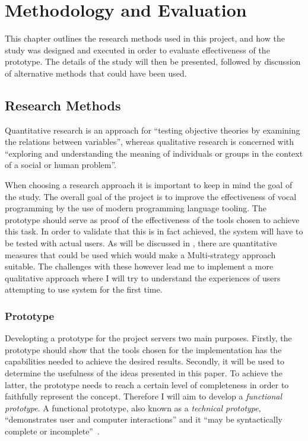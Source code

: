\documentclass[../thesis.tex]{subfiles}
\begin{document}
\chapter{Methodology and Evaluation}\label{methodology_and_evaluation}
This chapter outlines the research methods used in this project,
and how the study was designed and executed in order to evaluate effectiveness of the prototype.
The details of the study will then be presented, followed by
discussion of alternative methods that could have been used.


\section{Research Methods}
Quantitative research is an approach for ``testing objective theories by examining the relations between variables'', whereas qualitative research is concerned with ``exploring and understanding the meaning of individuals or groups in the context of a social or human problem''. \parencite{creswell2018}

When choosing a research approach it is important to keep in mind the goal of the study.
The overall goal of the project is to improve the effectiveness of vocal programming by the use of modern programming language tooling.
The prototype should serve as proof of the effectiveness of the tools chosen to achieve this task.
In order to validate that this is in fact achieved, the system will have to be tested with actual users.
As will be discussed in , there are quantitative measures that could be used which would make a Multi-strategy approach suitable.
The challenges with these however lead me to implement a more qualitative approach where I will try to understand the experiences of users attempting to use system for the first time.



\subsection{Prototype}
Developting a prototype for the project servers two main purposes.
Firstly, the prototype should show that the tools chosen for the implementation has the capabilities needed to achieve the desired results.
Secondly, it will be used to determine the usefulness of the ideas presented in this paper.
To achieve the latter, the prototype needs to reach a certain level of completeness in order to faithfully represent the concept.
Therefore I will aim to develop a \textit{functional prototype}.
A functional prototype, also known as a \textit{technical prototype}, ``demonstrates user and computer interactions'' and it 
``may be syntactically complete or incomplete''~\parencite{jones2000rapid}.
\end{document}
